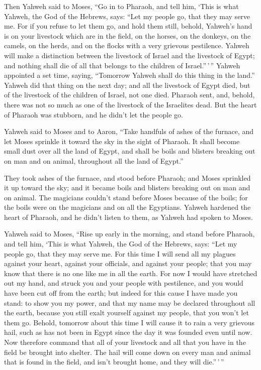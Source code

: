  Then Yahweh said to Moses, ``Go in to Pharaoh, and tell
him, `This is what Yahweh, the God of the Hebrews, says: ``Let my people
go, that they may serve me.  For if you refuse to let them
go, and hold them still,  behold, Yahweh's hand is on your
livestock which are in the field, on the horses, on the donkeys, on the
camels, on the herds, and on the flocks with a very grievous pestilence.
 Yahweh will make a distinction between the livestock of
Israel and the livestock of Egypt; and nothing shall die of all that
belongs to the children of Israel.''\,'\,''  Yahweh
appointed a set time, saying, ``Tomorrow Yahweh shall do this thing in
the land.''  Yahweh did that thing on the next day; and
all the livestock of Egypt died, but of the livestock of the children of
Israel, not one died.  Pharaoh sent, and, behold, there
was not so much as one of the livestock of the Israelites dead. But the
heart of Pharaoh was stubborn, and he didn't let the people go.

 Yahweh said to Moses and to Aaron, ``Take handfuls of
ashes of the furnace, and let Moses sprinkle it toward the sky in the
sight of Pharaoh.  It shall become small dust over all the
land of Egypt, and shall be boils and blisters breaking out on man and
on animal, throughout all the land of Egypt.''

 They took ashes of the furnace, and stood before
Pharaoh; and Moses sprinkled it up toward the sky; and it became boils
and blisters breaking out on man and on animal.  The
magicians couldn't stand before Moses because of the boils; for the
boils were on the magicians and on all the Egyptians. 
Yahweh hardened the heart of Pharaoh, and he didn't listen to them, as
Yahweh had spoken to Moses.

 Yahweh said to Moses, ``Rise up early in the morning,
and stand before Pharaoh, and tell him, `This is what Yahweh, the God of
the Hebrews, says: ``Let my people go, that they may serve me.
 For this time I will send all my plagues against your
heart, against your officials, and against your people; that you may
know that there is no one like me in all the earth.  For
now I would have stretched out my hand, and struck you and your people
with pestilence, and you would have been cut off from the earth;
 but indeed for this cause I have made you stand: to show
you my power, and that my name may be declared throughout all the earth,
 because you still exalt yourself against my people, that
you won't let them go.  Behold, tomorrow about this time
I will cause it to rain a very grievous hail, such as has not been in
Egypt since the day it was founded even until now.  Now
therefore command that all of your livestock and all that you have in
the field be brought into shelter. The hail will come down on every man
and animal that is found in the field, and isn't brought home, and they
will die.''\,'\,''

